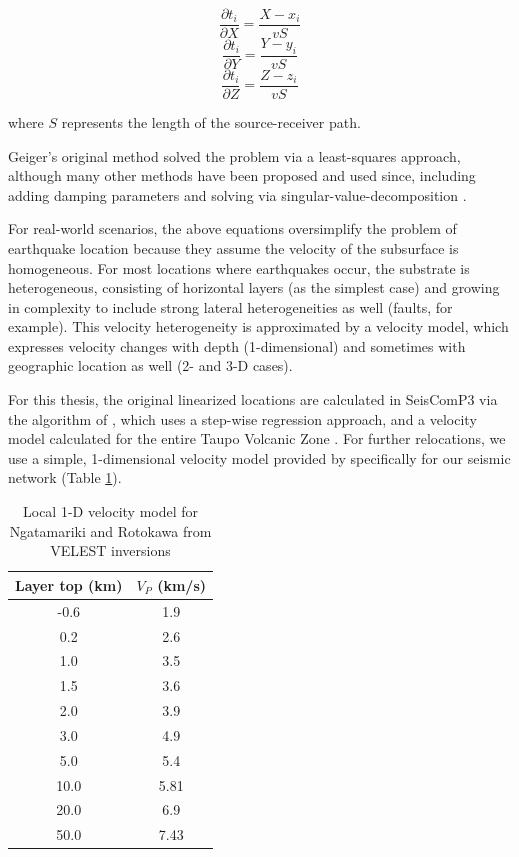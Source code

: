 \begin{equation}
\frac{\partial{t_i}}{\partial{X}} = \frac{X - x_i}{vS}
\end{equation}
\begin{equation}
\frac{\partial{t_i}}{\partial{Y}} = \frac{Y - y_i}{vS}
\end{equation}
\begin{equation}
\frac{\partial{t_i}}{\partial{Z}} = \frac{Z - z_i}{vS}
\end{equation}

where $S$ represents the length of the source-receiver path.

Geiger's original method solved the problem via a least-squares approach, although many other methods have been proposed and used since, including adding damping parameters and solving via singular-value-decomposition \citep{thurber1985nonlinear}.

For real-world scenarios, the above equations oversimplify the problem of earthquake location because they assume the velocity of the subsurface is homogeneous. For most locations where earthquakes occur, the substrate is heterogeneous, consisting of horizontal layers (as the simplest case) and growing in complexity to include strong lateral heterogeneities as well (faults, for example). This velocity heterogeneity is approximated by a velocity model, which expresses velocity changes with depth (1-dimensional) and sometimes with geographic location as well (2- and 3-D cases).

For this thesis, the original linearized locations are calculated in SeisComP3 via the algorithm of \citet{Lee_1972}, which uses a step-wise regression approach, and a velocity model calculated for the entire Taupo Volcanic Zone \citep{Sherburn_2003}. For further relocations, we use a simple, 1-dimensional velocity model provided by \citet{sewell2017} specifically for our seismic network (Table \ref{vmod}).

\begin{table}
\centering
\begin{tabular}{cc}
    {Layer top (km)} & {$V_{P}$ (km/s)} \\ \midrule
    -0.6  & 1.9 \\
    0.2  & 2.6  \\
    1.0  & 3.5  \\
    1.5  & 3.6  \\
    2.0  & 3.9   \\
    3.0  & 4.9  \\
    5.0  & 5.4  \\
    10.0  & 5.81  \\
    20.0  & 6.9  \\
    50.0 & 7.43   \\
\end{tabular}
\caption[1-D velocity model used in this thesis]{{
Local 1-D velocity model for Ngatamariki and Rotokawa from VELEST inversions}}
\label{vmod}
\end{table}

